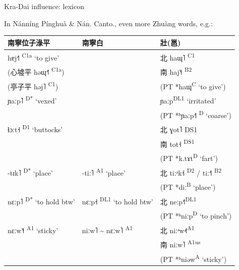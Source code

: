 \documentclass{beamer}
\begin{document}
\begin{frame}[fragile]{Kra-Dai influence: lexicon}

{\small In Nánníng Pínghuà \& Nán. Canto., even more Zhuàng words, e.g.:}\\
\bigskip
{\footnotesize
\begin{tabular}{l|l|l}
    南寧位子淥平 & 南寧白 & 壯(邕) \\ \hline
    hɐj˧˥ \textsuperscript{C1a} \enquote*{to give} & & 北 haɰ˥ \textsuperscript{C1}\\ 
    (心墟平 həɰ˧˥ \textsuperscript{C1a}) & & 南 haj˥˧ \textsuperscript{B2}\\
    (亭子平 həj˥ \textsuperscript{C1}) & & (PT *haɰ\textsuperscript{C} \enquote*{to give})\\ \hline
    ɲaːp˥ \textsuperscript{D*} \enquote*{vexed} & & ɲaːp\textsuperscript{DL1} \enquote*{irritated}\\
     & & (PT *ʰɲaːp˧˥ \textsuperscript{D} \enquote*{coarse})\\ \hline
    ɬɔːt˧ \textsuperscript{D1} \enquote*{buttocks} & & 北 ɣot˥ \textsuperscript{}{DS1}\\
     & & 南 tot˧ \textsuperscript{DS1}\\
     & & (PT *k.tɤt\textsuperscript{D} \enquote*{fart})\\ \hline 
    -tɪk˥ \textsuperscript{D*} \enquote*{place} & -tiː˥ \textsuperscript{A1} \enquote*{place} & 北 tiːᵊk˧ \textsuperscript{D2} / tiː˧˥ \textsuperscript{B2}\\
     & & (PT *diː\textsuperscript{B} \enquote*{place})\\ \hline
    nɛːp˥ \textsuperscript{D*} \enquote*{to hold btw} & nɛːp˧ \textsuperscript{DL1} \enquote*{to hold btw} & 北 neːp˧˥\textsuperscript{DL1}\\
     & & (PT *ʰniːp\textsuperscript{D} \enquote*{to pinch})\\ \hline
    nɛːw˥˧ \textsuperscript{A1} \enquote*{sticky} & niːw˥ \~{} nɛːw˥ \textsuperscript{A1} & 北 niːᵊw˨˦\textsuperscript{A1}\\
     & & 南 niːw˥ \textsuperscript{A1us}\\
     & & (PT *ʰniəw\textsuperscript{A} \enquote*{sticky})\\ %
\end{tabular}}

\end{frame}
\end{document}
